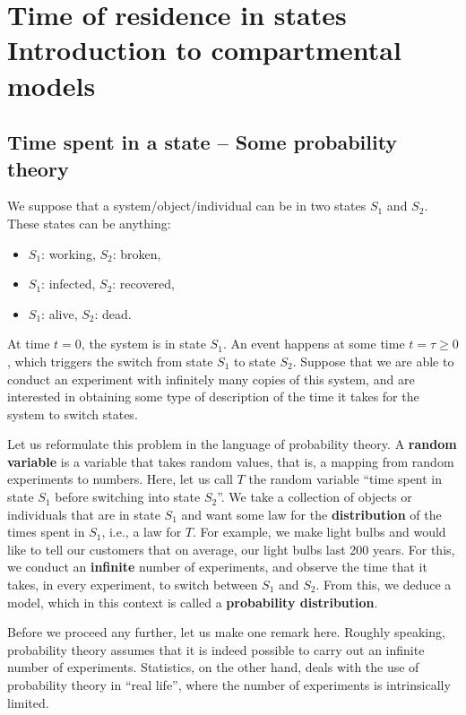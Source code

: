 \chapter[Residence time]{Time of residence in states\\[0.5cm] Introduction to
compartmental models}
\label{chap:residence_time}


\section{Time spent in a state -- Some probability theory}
\label{sec:residence_time}
We suppose that a system/object/individual can be in two states $S_1$ and $S_2$.
These states can be anything:
\begin{itemize}
\item $S_1$: working, $S_2$: broken,
\item $S_1$: infected, $S_2$: recovered,
\item $S_1$: alive, $S_2$: dead.
\end{itemize}
At time $t=0$, the system is in state $S_1$.
An event happens at some time $t=\tau\geq 0$, which triggers the switch from state $S_1$ to state $S_2$. Suppose that we are able to conduct an experiment with infinitely many copies of this system, and are interested in obtaining some type of description of the time it takes for the system to switch states.

Let us reformulate this problem in the language of probability theory.
A \textbf{random variable} is a variable that takes random values, that is, a mapping from random experiments to numbers. 
Here, let us call $T$ the random variable ``time spent in state $S_1$ before switching into state $S_2$''. 
We take a collection of objects or individuals that are in state $S_1$ and want some law for the \textbf{distribution} of the times spent in $S_1$, i.e., a law for $T$.
For example, we make light bulbs and would like to tell our customers that on average, our light bulbs last 200 years.
For this, we conduct an \textbf{infinite} number of experiments, and observe the time that it takes, in every experiment, to switch between $S_1$ and $S_2$.
From this, we deduce a model, which in this context is called a \textbf{probability distribution}.

Before we proceed any further, let us make one remark here. Roughly speaking, probability theory assumes that it is indeed possible to carry out an infinite number of experiments. Statistics, on the other hand, deals with the use of probability theory in ``real life'', where the number of experiments is intrinsically limited.

